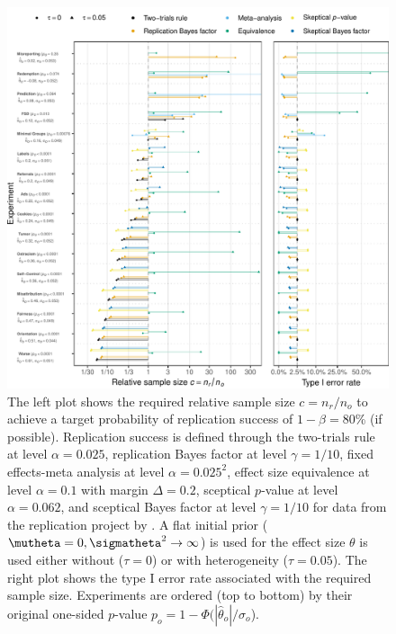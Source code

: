\begin{figure}[!htb]
\begin{knitrout}
\color{fgcolor}
\includegraphics[width=\textwidth]{images/paper3/ssd-protzko-1}
\end{knitrout}
\caption{The left plot shows the required relative sample size $c = n_r/n_o$ to
  achieve a target probability of replication success of
  $1 - \beta = 80$\% (if possible). Replication success
  is defined through the two-trials rule at level $\alpha = 0.025$,
  replication Bayes factor at level $\gamma = 1/10$, fixed
  effects-meta analysis at level $\alpha = 0.025^{2}$,
  effect size equivalence at level $\alpha = 0.1$ with margin
  $\Delta = 0.2$, sceptical $p$-value at level
  $\alpha = 0.062$, and sceptical Bayes factor at level
  $\gamma = 1/10$ for data from the replication project by
  \citet{Protzko2020}. A flat initial prior
  ($\mutheta = 0, \sigmatheta^{2} \to \infty$) is used for the effect size
  $\theta$ is used either without ($\tau = 0$) or with heterogeneity
  ($\tau = 0.05$). The right plot shows the type I error
  rate associated with the required sample size. Experiments are ordered (top to
  bottom) by their original one-sided $p$-value
  $p_{o} = 1 - \Phi(|\hat{\theta}_{o}|/\sigma_{o}$).}
\label{fig:ssd-all}
\end{figure}


